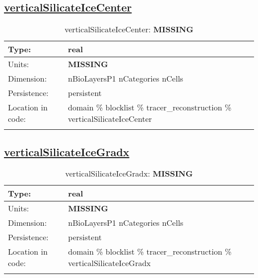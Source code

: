 \subsection[verticalSilicateIceCenter]{\hyperref[sec:var_tab_tracer_reconstruction]{verticalSilicateIceCenter}}
\label{subsec:var_sec_tracer_reconstruction_verticalSilicateIceCenter}
\begin{center}
\begin{longtable}{| p{2.0in} | p{4.0in} |}
        \hline 
        Type: & real \\
        \hline 
        Units: & {\bf \color{red} MISSING} \\
        \hline 
        Dimension: & nBioLayersP1 nCategories nCells \\
        \hline 
        Persistence: & persistent \\
        \hline 
         Location in code: & domain \% blocklist \% tracer\_reconstruction \% verticalSilicateIceCenter \\
         \hline 
    \caption{verticalSilicateIceCenter: {\bf \color{red} MISSING}}
\end{longtable}
\end{center}
\subsection[verticalSilicateIceGradx]{\hyperref[sec:var_tab_tracer_reconstruction]{verticalSilicateIceGradx}}
\label{subsec:var_sec_tracer_reconstruction_verticalSilicateIceGradx}
\begin{center}
\begin{longtable}{| p{2.0in} | p{4.0in} |}
        \hline 
        Type: & real \\
        \hline 
        Units: & {\bf \color{red} MISSING} \\
        \hline 
        Dimension: & nBioLayersP1 nCategories nCells \\
        \hline 
        Persistence: & persistent \\
        \hline 
         Location in code: & domain \% blocklist \% tracer\_reconstruction \% verticalSilicateIceGradx \\
         \hline 
    \caption{verticalSilicateIceGradx: {\bf \color{red} MISSING}}
\end{longtable}
\end{center}
